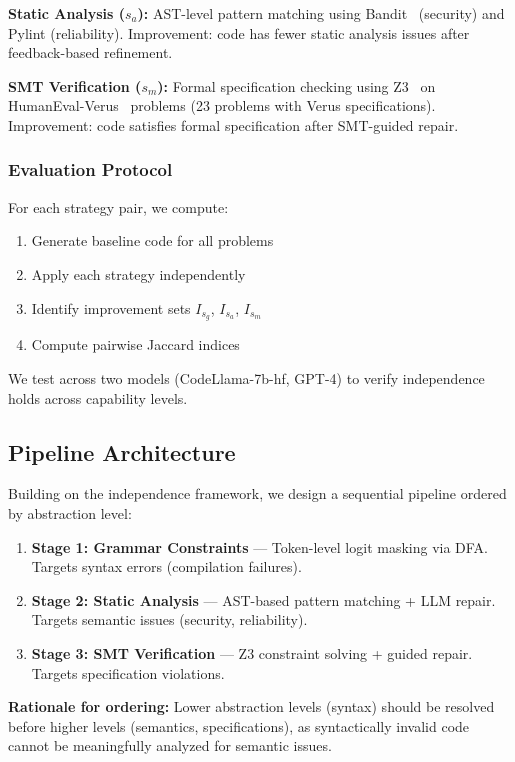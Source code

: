 \textbf{Static Analysis ($s_a$):} AST-level pattern matching using Bandit~\cite{bandit2024} (security) and Pylint (reliability). Improvement: code has fewer static analysis issues after feedback-based refinement.

\textbf{SMT Verification ($s_m$):} Formal specification checking using Z3~\cite{z3solver} on HumanEval-Verus~\cite{humaneval_verus2024} problems (23 problems with Verus specifications). Improvement: code satisfies formal specification after SMT-guided repair.

\subsubsection{Evaluation Protocol}

For each strategy pair, we compute:
\begin{enumerate}
    \item Generate baseline code for all problems
    \item Apply each strategy independently
    \item Identify improvement sets $I_{s_g}$, $I_{s_a}$, $I_{s_m}$
    \item Compute pairwise Jaccard indices
\end{enumerate}

We test across two models (CodeLlama-7b-hf, GPT-4) to verify independence holds across capability levels.

\subsection{Pipeline Architecture}

Building on the independence framework, we design a sequential pipeline ordered by abstraction level:

\begin{enumerate}
    \item \textbf{Stage 1: Grammar Constraints} --- Token-level logit masking via DFA. Targets syntax errors (compilation failures).
    \item \textbf{Stage 2: Static Analysis} --- AST-based pattern matching + LLM repair. Targets semantic issues (security, reliability).
    \item \textbf{Stage 3: SMT Verification} --- Z3 constraint solving + guided repair. Targets specification violations.
\end{enumerate}

\textbf{Rationale for ordering:} Lower abstraction levels (syntax) should be resolved before higher levels (semantics, specifications), as syntactically invalid code cannot be meaningfully analyzed for semantic issues.

